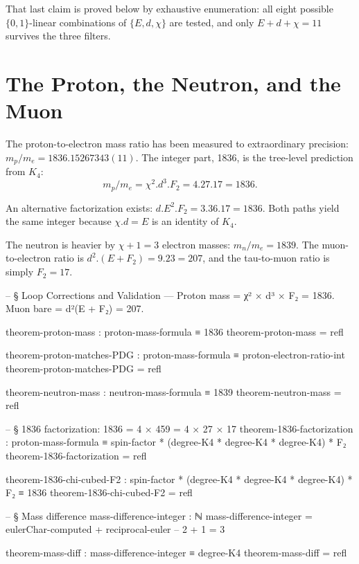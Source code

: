 \documentclass[11pt,a4paper]{book}
\def\cdot{.}%
\begin{document}
That last claim is proved below by exhaustive enumeration: all eight possible $\{0,1\}$-linear combinations of $\{E, d, \chi\}$ are tested, and only $E + d + \chi = 11$ survives the three filters.

\section{The Proton, the Neutron, and the Muon}

The proton-to-electron mass ratio has been measured to extraordinary precision: $m_p/m_e = 1836.15267343(11)$. The integer part, 1836, is the tree-level prediction from $K_4$:
\[
m_p/m_e = \chi^2 \cdot d^3 \cdot F_2 = 4 \cdot 27 \cdot 17 = 1836.
\]

An alternative factorization exists: $d \cdot E^2 \cdot F_2 = 3 \cdot 36 \cdot 17 = 1836$. Both paths yield the same integer because $\chi \cdot d = E$ is an identity of $K_4$.%

The neutron is heavier by $\chi + 1 = 3$ electron masses: $m_n/m_e = 1839$. The muon-to-electron ratio is $d^2 \cdot (E + F_2) = 9 \cdot 23 = 207$, and the tau-to-muon ratio is simply $F_2 = 17$.

\begin{code}
-- § Loop Corrections and Validation — Proton mass = χ² × d³ × F₂ = 1836. Muon bare = d²(E + F₂) = 207.

theorem-proton-mass : proton-mass-formula ≡ 1836
theorem-proton-mass = refl

theorem-proton-matches-PDG : proton-mass-formula ≡ proton-electron-ratio-int
theorem-proton-matches-PDG = refl

theorem-neutron-mass : neutron-mass-formula ≡ 1839
theorem-neutron-mass = refl

-- § 1836 factorization: 1836 = 4 × 459 = 4 × 27 × 17
theorem-1836-factorization : proton-mass-formula ≡ spin-factor * (degree-K4 * degree-K4 * degree-K4) * F₂
theorem-1836-factorization = refl

theorem-1836-chi-cubed-F2 : spin-factor * (degree-K4 * degree-K4 * degree-K4) * F₂ ≡ 1836
theorem-1836-chi-cubed-F2 = refl

-- § Mass difference
mass-difference-integer : ℕ
mass-difference-integer = eulerChar-computed + reciprocal-euler  -- 2 + 1 = 3

theorem-mass-diff : mass-difference-integer ≡ degree-K4
theorem-mass-diff = refl
\end{code}
\end{document}
